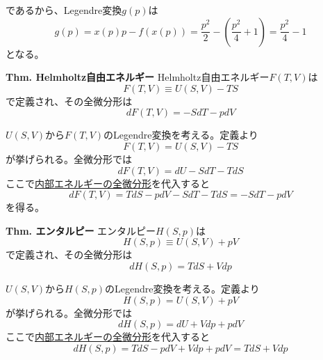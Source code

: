 \documentclass{jsarticle}
\begin{document}
であるから、Legendre変換\(g(p)\)は
\begin{equation*}
    g(p)=x(p)p-f(x(p))=\frac{p^{2}}{2}-\left(\frac{p^2}{4}+1\right)=\frac{p^2}{4}-1
\end{equation*}
となる。\\
\hypertarget{Helmholtz自由エネルギー}{}
\begin{itembox}[l]{\textbf{Thm. Helmholtz自由エネルギー}}
    Helmholtz自由エネルギー\(F(T,V)\)は
    \begin{equation*}
        F(T,V)\equiv U(S,V)-TS
    \end{equation*}
    で定義され、その全微分形は
    \begin{equation*}
        dF(T,V)=-SdT-pdV
    \end{equation*}
\end{itembox}
\(U(S,V)\)から\(F(T,V)\)のLegendre変換を考える。定義より
\begin{equation*}
    F(T,V)=U(S,V)-TS
\end{equation*}
が挙げられる。全微分形では
\begin{equation*}
    dF(T,V)=dU-SdT-TdS
\end{equation*}
ここで\hyperlink{内部エネルギーの全微分形}{内部エネルギーの全微分形}を代入すると
\begin{equation*}
    dF(T,V)=TdS-pdV-SdT-TdS=-SdT-pdV
\end{equation*}
を得る。\\
\hypertarget{エンタルピー}{}
\begin{itembox}[l]{\textbf{Thm. エンタルピー}}
    エンタルピー\(H(S,p)\)は
    \begin{equation*}
        H(S,p)\equiv U(S,V)+pV
    \end{equation*}
    で定義され、その全微分形は
    \begin{equation*}
        dH(S,p)=TdS+Vdp
    \end{equation*}
\end{itembox}
\(U(S,V)\)から\(H(S,p)\)のLegendre変換を考える。定義より
\begin{equation*}
    H(S,p)=U(S,V)+pV
\end{equation*}
が挙げられる。全微分形では
\begin{equation*}
    dH(S,p)=dU+Vdp+pdV
\end{equation*}
ここで\hyperlink{内部エネルギーの全微分形}{内部エネルギーの全微分形}を代入すると
\begin{equation*}
    dH(S,p)=TdS-pdV+Vdp+pdV=TdS+Vdp
\end{equation*}
\end{document}
